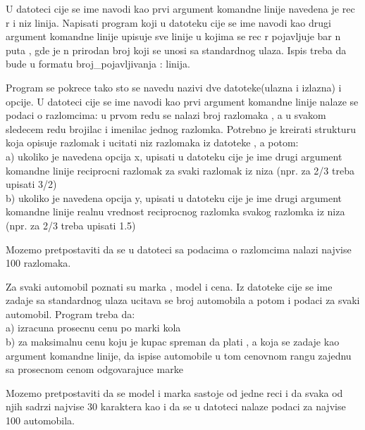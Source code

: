 \begin{Exercise}[label=v3_04] 
U datoteci cije se ime navodi kao prvi argument komandne
linije navedena je rec r i niz linija. Napisati
program koji u datoteku cije se ime navodi kao
drugi argument komandne linije upisuje sve linije
u kojima se rec r pojavljuje bar n puta , gde je
n prirodan broj koji se unosi sa standardnog ulaza. Ispis
treba da bude u formatu broj\_pojavljivanja : linija.
\end{Exercise}
\begin{Answer}[ref=v3_04]
\end{Answer}

\begin{Exercise}[label=v3_05] 
Program se pokrece tako sto se navedu nazivi dve datoteke(ulazna i
izlazna) i opcije.
U datoteci cije se ime navodi kao prvi argument komandne linije
nalaze se podaci o razlomcima:
u prvom redu se nalazi broj razlomaka , a u svakom sledecem redu
brojilac i imenilac jednog razlomka.
Potrebno je kreirati strukturu koja opisuje razlomak i ucitati niz
razlomaka
iz datoteke , a potom:\\
a) ukoliko je navedena opcija x, upisati u datoteku cije je ime
drugi argument komandne linije
reciprocni razlomak za svaki razlomak iz niza (npr. za 2/3
treba upisati 3/2) \\
b) ukoliko je navedena opcija y, upisati u datoteku cije je ime
drugi argument komandne linije
realnu vrednost reciprocnog razlomka svakog razlomka iz niza
(npr. za 2/3 treba upisati 1.5)

Mozemo pretpostaviti da se u datoteci sa podacima o razlomcima
nalazi najvise 100 razlomaka.
\end{Exercise}
\begin{Answer}[ref=v3_05]
\end{Answer}

\begin{Exercise}[label=v3_06] 
Za svaki automobil poznati su marka , model i cena. Iz datoteke cije
se ime zadaje sa standardnog ulaza ucitava se broj automobila a
potom
i podaci za svaki automobil. Program treba da: \\
a) izracuna prosecnu cenu po marki kola \\
b) za maksimalnu cenu koju je kupac spreman da plati , a koja se
zadaje kao argument komandne linije, da ispise automobile u tom cenovnom
rangu zajednu sa prosecnom cenom odgovarajuce marke

Mozemo pretpostaviti da se model i marka sastoje od jedne reci i
da svaka od njih sadrzi najvise 30 karaktera kao i da se u datoteci
nalaze podaci za najvise 100 automobila.
\end{Exercise}
\begin{Answer}[ref=v3_06]
\end{Answer}








